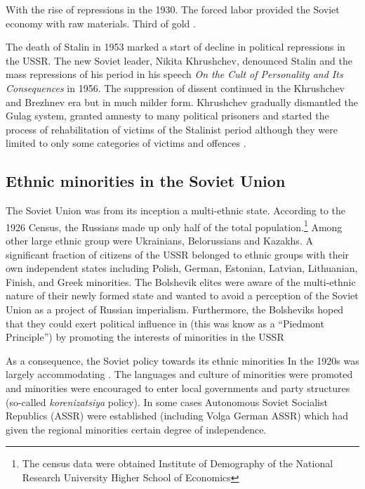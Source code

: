 With the rise of repressions in the 1930.
The forced labor provided the Soviet economy with raw materials. Third of gold \citep{applebaum_gulag:_2004}. 

The death of Stalin in 1953 marked a start of decline in political repressions in the USSR. The new Soviet leader, Nikita Khrushchev, denounced Stalin and the mass repressions of his period in his speech \emph{On the Cult of Personality and Its Consequences} in 1956. The suppression of dissent continued in the Khrushchev and  Brezhnev era but in much milder form. Khrushchev gradually dismantled the Gulag system, granted amnesty to many political prisoners and started the process of rehabilitation of victims of the Stalinist period although they were limited to only some categories of victims and offences \citep{applebaum_gulag:_2004, dobson_khrushchevs_2009}. 

\subsection{Ethnic minorities in the Soviet Union}
The Soviet Union was from its inception a multi-ethnic state. 
According to the 1926 Census, the Russians made up only half of the total population.\footnote{The census data were obtained  Institute of Demography of the National Research University Higher School of Economics} Among other large ethnic group were Ukrainians, Belorussians and Kazakhs.  A significant fraction of citizens of the USSR belonged to ethnic groups with their own independent states including Polish, German, Estonian, Latvian, Lithuanian, Finish,  and Greek minorities. 
The Bolshevik elites were aware of the multi-ethnic nature of their newly formed state and wanted to  avoid a perception of the Soviet Union as a project of Russian imperialism. Furthermore, the Bolsheviks hoped that
they could exert political influence in (this was know as a \enquote{Piedmont Principle})
by promoting the interests of minorities in the USSR

As a consequence, the Soviet policy towards its ethnic minorities In the 1920s was largely accommodating \citep{martin_affirmative_2001}. The languages and culture of minorities were promoted and minorities were encouraged to enter local governments and party structures (so-called \emph{korenizatsiya} policy). In some cases Autonomous Soviet Socialist Republics (ASSR) were established (including Volga German ASSR) which had given the regional minorities certain degree of independence. 


